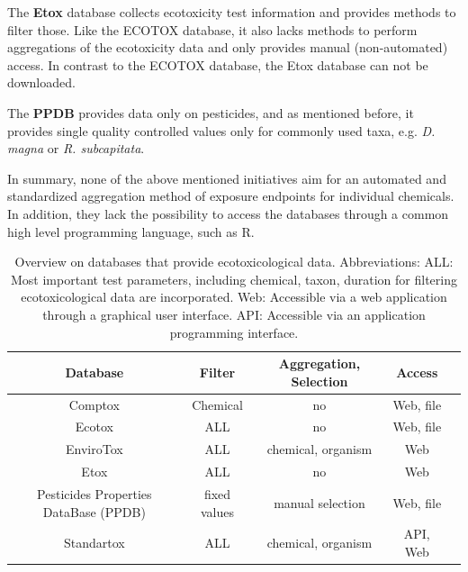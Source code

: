 \documentclass[journal,datadescriptor,submit,moreauthors,pdftex]{Definitions/mdpi}
\begin{document}
\par
The \textbf{Etox} database collects ecotoxicity test information and provides methods to filter those. Like the ECOTOX database, it also lacks methods to perform aggregations of the ecotoxicity data and only provides manual (non-automated) access. In contrast to the ECOTOX database, the Etox database can not be downloaded.
\par
The \textbf{PPDB} provides data only on pesticides, and as mentioned before, it provides single quality controlled values only for commonly used taxa, e.g. \textit{D. magna} or \textit{R. subcapitata}.
\par
In summary, none of the above mentioned initiatives aim for an automated and standardized aggregation method of exposure endpoints for individual chemicals. In addition, they lack the possibility to access the databases through a common high level programming language, such as R.

\begin{table}[H]
    \caption{Overview on databases that provide ecotoxicological data. Abbreviations: ALL: Most important test parameters, including chemical, taxon, duration for filtering ecotoxicological data are incorporated. Web: Accessible via a web application through a graphical user interface. API: Accessible via an application programming interface.}
    \label{tab:database-differences}
    \centering
    \begin{tabular}{ccccc}
    \toprule
    \textbf{Database} & \textbf{Filter} & \textbf{Aggregation, Selection} & \textbf{Access} \\
    \midrule
    Comptox \citep{williams_comptox_2017} & Chemical & no & Web, file \\
    Ecotox \citep{usepa_ecotox_2019} & ALL & no & Web, file \\
    EnviroTox \citep{healthandenvironmentalsciencesinstitutehesi_envirotox_2019} & ALL & chemical, organism & Web \\
    Etox \citep{umweltbundesamt_etox_2019} & ALL & no & Web \\
    Pesticides Properties DataBase (PPDB) \citep{lewis_international_2016} & fixed values & manual selection & Web, file \\
    Standartox & ALL & chemical, organism & API, Web \\
    \bottomrule
\end{tabular}
\end{table}
\end{document}
